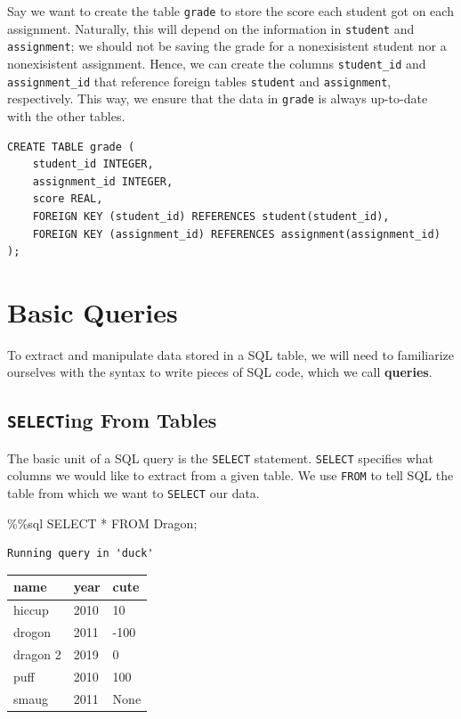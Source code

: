 \documentclass[
  letterpaper,
  DIV=11,
  numbers=noendperiod]{scrreprt}
\newenvironment{Shaded}{\begin{snugshade}}{\end{snugshade}}
\newcommand{\NormalTok}[1]{\textcolor[rgb]{0.00,0.23,0.31}{#1}}
\newcommand{\OperatorTok}[1]{\textcolor[rgb]{0.37,0.37,0.37}{#1}}
\begin{document}
Say we want to create the table \texttt{grade} to store the score each
student got on each assignment. Naturally, this will depend on the
information in \texttt{student} and \texttt{assignment}; we should not
be saving the grade for a nonexisistent student nor a nonexisistent
assignment. Hence, we can create the columns \texttt{student\_id} and
\texttt{assignment\_id} that reference foreign tables \texttt{student}
and \texttt{assignment}, respectively. This way, we ensure that the data
in \texttt{grade} is always up-to-date with the other tables.

\begin{verbatim}
CREATE TABLE grade (
    student_id INTEGER,
    assignment_id INTEGER,
    score REAL,
    FOREIGN KEY (student_id) REFERENCES student(student_id),
    FOREIGN KEY (assignment_id) REFERENCES assignment(assignment_id)
);
\end{verbatim}

\section{Basic Queries}\label{basic-queries}

To extract and manipulate data stored in a SQL table, we will need to
familiarize ourselves with the syntax to write pieces of SQL code, which
we call \textbf{queries}.

\subsection{\texorpdfstring{\texttt{SELECT}ing From
Tables}{SELECTing From Tables}}\label{selecting-from-tables}

The basic unit of a SQL query is the \texttt{SELECT} statement.
\texttt{SELECT} specifies what columns we would like to extract from a
given table. We use \texttt{FROM} to tell SQL the table from which we
want to \texttt{SELECT} our data.

\begin{Shaded}
\begin{Highlighting}[]
\OperatorTok{\%\%}\NormalTok{sql}
\NormalTok{SELECT }\OperatorTok{*}
\NormalTok{FROM Dragon}\OperatorTok{;}
\end{Highlighting}
\end{Shaded}

\begin{verbatim}
Running query in 'duck'
\end{verbatim}

\begin{longtable}[]{@{}lll@{}}
\toprule\noalign{}
name & year & cute \\
\midrule\noalign{}
\endhead
\bottomrule\noalign{}
\endlastfoot
hiccup & 2010 & 10 \\
drogon & 2011 & -100 \\
dragon 2 & 2019 & 0 \\
puff & 2010 & 100 \\
smaug & 2011 & None \\
\end{longtable}
\end{document}
